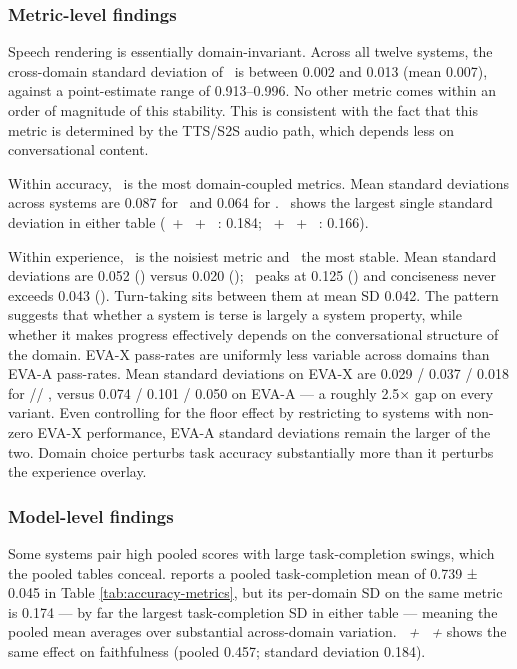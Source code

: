 \subsubsection{Metric-level findings}

  Speech rendering is essentially domain-invariant. Across all twelve systems, the cross-domain standard deviation of \metricfidelity~is between 0.002 and 0.013 (mean 0.007), against a point-estimate range of 0.913–0.996. No
   other metric comes within an order of magnitude of this stability. This is consistent with the fact that this metric is determined by the TTS/S2S audio path, which depends less on conversational content.

Within accuracy, \metricfaithfulness~is the most domain-coupled metrics. Mean standard deviations across systems are 0.087 for  \metricfaithfulness~and 0.064 for \metrictaskcompletion. \metricfaithfulness~shows the largest single standard deviation in either table (\scribefull~+ \geminiflashfull~+ \conversationalfull~: 0.184; \inkfull~+ \haikufull~+ \sonicfull~: 0.166).

  Within experience, \metricconversationprogression~is the noisiest metric and \metricconcise~the most stable. Mean standard deviations are 0.052 (\metricconversationprogression) versus 0.020 (\metricconcise); \metricconversationprogression~peaks at 0.125
  (\ultravoxfull) and conciseness never exceeds 0.043 (\ultravoxfull). Turn-taking sits between them at mean SD 0.042. The pattern suggests that whether a system is terse is largely a system property, while whether it makes progress effectively depends on the conversational structure of the domain. EVA-X pass-rates are uniformly less variable across domains than EVA-A pass-rates. Mean standard deviations on EVA-X are 0.029 / 0.037 / 0.018 for \passatone /\passatk / \passpowerk, versus 0.074 / 0.101 / 0.050 on EVA-A — a roughly 2.5× gap on every variant. Even controlling for the floor effect by restricting to systems with non-zero EVA-X performance, EVA-A standard deviations remain the larger of the two. Domain choice perturbs task accuracy substantially more than it perturbs the experience overlay.


\subsubsection{Model-level findings}
  Some systems pair high pooled scores with large task-completion swings, which the pooled tables conceal. \emph{\gptrealtimefull} reports a pooled task-completion mean of 0.739 ± 0.045 in Table
  \ref{tab:accuracy-metrics}, but its per-domain SD on the same metric is 0.174 — by far the largest task-completion SD in either table — meaning the pooled mean averages over substantial across-domain
  variation. \emph{\scribefull~+ \geminiflashfull~+ \conversationalfull} shows the same effect on faithfulness (pooled 0.457; standard deviation 0.184).

